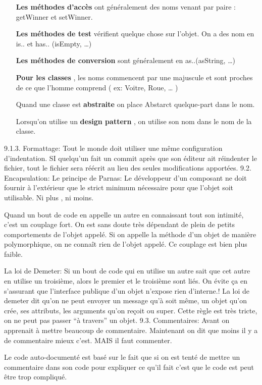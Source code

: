 \begin{itemize}
	\item [\textbf{Les méthodes d’accès}] ont généralement des noms venant par paire : getWinner et setWinner.
	\item[\textbf{Les méthodes de test}] vérifient quelque chose sur l’objet. On a des nom en is.. et has.. (isEmpty, …)
	\item[\textbf{Les méthodes de conversion}] sont généralement en as..(asString, …)
	\item[\textbf{Pour les classes}], les noms commencent par une majuscule et sont proches de ce que l’homme comprend ( ex: Voitre, Roue, … )
	\item[Quand une classe est \textbf{abstraite}] on place Abstarct quelque-part dans le nom.
	\item[Lorsqu’on utilise un \textbf{design pattern}], on utilise son nom dans le nom de la classe.
\end{itemize}

9.1.3. Formattage:
Tout le monde doit utiliser une même configuration d’indentation.
SI quelqu’un fait un commit après que son éditeur ait réindenter le fichier, tout le fichier sera réécrit au lieu des seules modifications apportées.
9.2. Encapsulation:
Le principe de Parnas: Le développeur d’un composant ne doit fournir à l’extérieur que le strict minimum nécessaire pour que l’objet soit utilisable. Ni plus , ni moins.

Quand un bout de code en appelle un autre en connaissant tout son intimité, c’est un couplage fort. On est sans doute très dépendant de plein de petits comportements de l’objet appelé.
Si on appelle la méthode d’un objet de manière polymorphique, on ne connaît rien de l’objet appelé. Ce couplage est bien plus faible.

La loi de Demeter: Si un bout de code qui en utilise un autre sait que cet autre en utilise un troisième, alors le premier et le troisième sont liés. On évite ça en s’assurant que l’interface publique d’un objet n’expose rien d’interne.!
La loi de demeter dit qu’on ne peut envoyer un message qu’à soit même, un objet qu’on crée, ses attributs, les arguments qu’on reçoit ou super. Cette règle est très tricte, on ne peut pas passer “à travers” un objet.
9.3. Commentaires:
Avant on apprenait à mettre beaucoup de commentaire. Maintenant on dit que moins il y a de commentaire mieux c’est. MAIS il faut commenter.

Le code auto-documenté est basé sur le fait que si on est tenté de mettre un commentaire dans son code pour expliquer ce qu’il fait c’est que le code est peut être trop compliqué.

